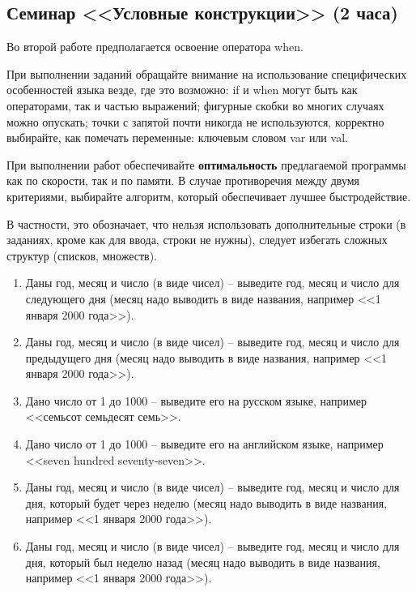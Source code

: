 \subsection{Семинар <<Условные конструкции>> (2 часа)}

Во второй работе предполагается освоение оператора when.

При выполнении заданий обращайте внимание на использование специфических особенностей языка везде, где это возможно: 
if и when могут быть как операторами, так и частью выражений; фигурные скобки во многих случаях можно опускать;
точки с запятой почти никогда не используются, корректно выбирайте, как помечать переменные: ключевым словом var или val.

При выполнении работ обеспечивайте \textbf{оптимальность} предлагаемой программы как по скорости, так и по памяти. В
случае противоречия между двумя критериями, выбирайте алгоритм, который обеспечивает лучшее быстродействие.

В частности, это обозначает, что нельзя использовать дополнительные строки (в заданиях, кроме как для ввода, строки не нужны),
следует избегать сложных структур (списков, множеств).

\begin{enumerate}
\item Даны год, месяц и число (в виде чисел) -- выведите год, месяц и число для следующего дня (месяц надо выводить в виде названия, например <<1 января 2000 года>>).
\item Даны год, месяц и число (в виде чисел) -- выведите год, месяц и число для предыдущего дня (месяц надо выводить в виде названия, например <<1 января 2000 года>>).
\item Дано число от 1 до 1000 -- выведите его на русском языке, например <<семьсот семьдесят семь>>.
\item Дано число от 1 до 1000 -- выведите его на английском языке, например <<seven hundred seventy-seven>>.

\item Даны год, месяц и число (в виде чисел) -- выведите год, месяц и число для дня, который будет через неделю (месяц надо выводить в виде названия, например <<1 января 2000 года>>).
\item Даны год, месяц и число (в виде чисел) -- выведите год, месяц и число для дня, который был неделю назад (месяц надо выводить в виде названия, например <<1 января 2000 года>>).

\end{enumerate}



